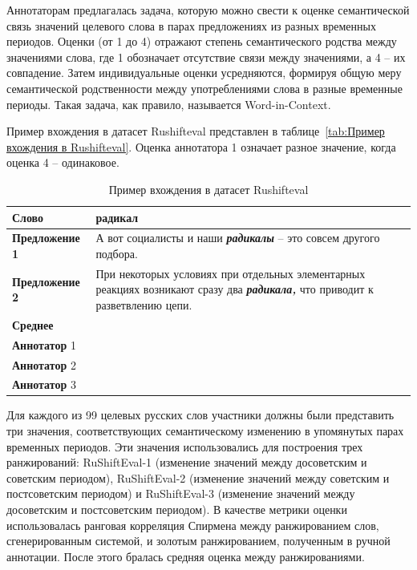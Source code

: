 \documentclass[LI,VKR]{HSEUniversity}
\begin{document}
Аннотаторам предлагалась задача, которую можно свести к оценке семантической связь значений
целевого слова в парах предложениях из разных временных периодов.
Оценки (от 1 до 4) отражают степень семантического родства между значениями слова, где
1 обозначает отсутствие связи между значениями, а 4 – их совпадение.
Затем индивидуальные оценки усредняются, формируя общую меру семантической родственности между
употреблениями слова в разные временные периоды.
Такая задача, как правило, называется Word-in-Context.

Пример вхождения в датасет Rushifteval представлен в таблице~\ref{tab:Пример вхождения в Rushifteval}.
Оценка аннотатора 1 означает разное значение, когда оценка 4 – одинаковое.

\begin{table}[H]
\centering
\caption{Пример вхождения в датасет Rushifteval}
\label{tab:Пример вхождения в датасет Rushifteval}
\begin{tabular}{|>{\raggedright\arraybackslash}p{4cm}|>{\raggedright\arraybackslash}p{10cm}|}
\hline
\textbf{Слово} & радикал \\
\hline
\textbf{Предложение 1} & А вот социалисты и наши \textbf{\textit{радикалы}} -- это совсем другого подбора. \\
\hline
\textbf{Предложение 2} & При некоторых условиях при отдельных элементарных реакциях возникают сразу два \textbf{\textit{радикала,}} что приводит к разветвлению цепи. \\
\hline
\textbf{Среднее} & 1.0 \\
\hline
\textbf{Аннотатор} 1 & 1 \\
\hline
\textbf{Аннотатор} 2 & 1 \\
\hline
\textbf{Аннотатор} 3 & 1 \\
\hline
\end{tabular}
\end{table}

Для каждого из 99 целевых русских слов участники должны
были представить три значения, соответствующих семантическому изменению в упомянутых парах
временных периодов.
Эти значения использовались для построения трех ранжирований:
RuShiftEval-1 (изменение значений между досоветским и советским периодом),
RuShiftEval-2 (изменение значений между советским и постсоветским периодом)
и RuShiftEval-3 (изменение значений между досоветским и постсоветским периодом).
В качестве метрики оценки использовалась ранговая корреляция Спирмена между ранжированием слов,
сгенерированным системой, и золотым ранжированием, полученным в ручной аннотации.
После этого бралась средняя оценка между ранжированиями.
\end{document}
